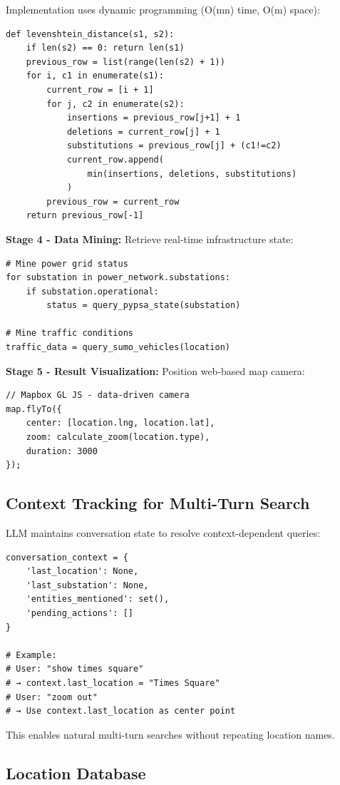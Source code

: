 \documentclass[sigconf]{acmart}
\begin{document}
Implementation uses dynamic programming (O(mn) time, O(m) space):
\begin{verbatim}
def levenshtein_distance(s1, s2):
    if len(s2) == 0: return len(s1)
    previous_row = list(range(len(s2) + 1))
    for i, c1 in enumerate(s1):
        current_row = [i + 1]
        for j, c2 in enumerate(s2):
            insertions = previous_row[j+1] + 1
            deletions = current_row[j] + 1
            substitutions = previous_row[j] + (c1!=c2)
            current_row.append(
                min(insertions, deletions, substitutions)
            )
        previous_row = current_row
    return previous_row[-1]
\end{verbatim}

\textbf{Stage 4 - Data Mining:} Retrieve real-time infrastructure state:
\begin{verbatim}
# Mine power grid status
for substation in power_network.substations:
    if substation.operational:
        status = query_pypsa_state(substation)

# Mine traffic conditions
traffic_data = query_sumo_vehicles(location)
\end{verbatim}

\textbf{Stage 5 - Result Visualization:} Position web-based map camera:
\begin{verbatim}
// Mapbox GL JS - data-driven camera
map.flyTo({
    center: [location.lng, location.lat],
    zoom: calculate_zoom(location.type),
    duration: 3000
});
\end{verbatim}

\subsection{Context Tracking for Multi-Turn Search}

LLM maintains conversation state to resolve context-dependent queries:

\begin{verbatim}
conversation_context = {
    'last_location': None,
    'last_substation': None,
    'entities_mentioned': set(),
    'pending_actions': []
}

# Example:
# User: "show times square"
# → context.last_location = "Times Square"
# User: "zoom out"
# → Use context.last_location as center point
\end{verbatim}

This enables natural multi-turn searches without repeating location names.

\subsection{Location Database}
\end{document}
